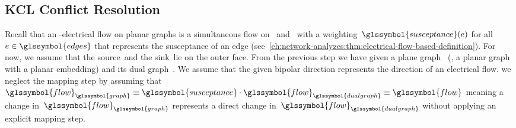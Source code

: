 \subsection{KCL Conflict Resolution}
\label{ch:network-analyzes:sec:kcl-conflict-resolution}
% 
% 
Recall that an \source-\sink electrical flow on planar graphs is a simultaneous
flow on~ and~ with a
weighting~$\glssymbol{susceptance}(\edge)$ for all~$\edge\in\glssymbol{edges}$
that represents the susceptance of an edge
(see~\cref{ch:network-analyzes:thm:electrical-flow-based-definition}). For now,
we assume that the source~\source and the sink~\sink lie on the outer face. From
the previous step we have given a plane graph~ (\ie, a planar
graph with a planar embedding) and its dual graph~. We
assume that the given bipolar direction represents the direction of an
electrical flow. \Wlog we neglect the mapping step by assuming that~$
\glssymbol{flow}_{\glssymbol{graph}}
\equiv
\glssymbol{susceptance}\cdot\glssymbol{flow}_{\glssymbol{dualgraph}}
\equiv\glssymbol{flow}$ meaning a change in~$\glssymbol{flow}_{
\glssymbol{graph}}$ represents a direct change
in~$\glssymbol{flow}_{\glssymbol{dualgraph}}$ without applying an explicit
mapping step.


